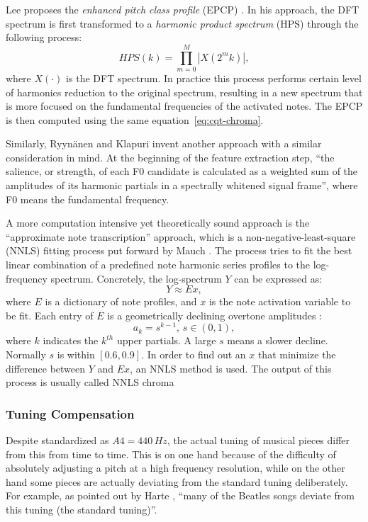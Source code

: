 Lee proposes the {\it enhanced pitch class profile} (EPCP) \cite{lee2006automatic}. In his approach, the DFT spectrum is first transformed to a {\it harmonic product spectrum} (HPS) through the following process:
\begin{equation}
HPS(k) = \prod_{m=0}^M |X(2^mk)|,
\end{equation}
where $X(\cdot)$ is the DFT spectrum. In practice this process performs certain level of harmonics reduction to the original spectrum, resulting in a new spectrum that is more focused on the fundamental frequencies of the activated notes. The EPCP is then computed using the same equation~\ref{eq:cqt-chroma}.

Similarly, Ryynänen and Klapuri invent another approach \cite{ryynanen2008automatic} with a similar consideration in mind. At the beginning of the feature extraction step, ``the salience, or strength, of each F0 candidate is calculated as a weighted sum of the amplitudes of its harmonic partials in a spectrally whitened signal frame'', where F0 means the fundamental frequency.

A more computation intensive yet theoretically sound approach is the ``approximate note transcription'' approach, which is a non-negative-least-square (NNLS) fitting process put forward by Mauch \cite{mauch2010approximate}. The process tries to fit the best linear combination of a predefined note harmonic series profiles to the log-frequency spectrum. Concretely, the log-spectrum $Y$ can be expressed as:
\begin{equation} \label{eq:2-nnls}
Y \approx Ex,
\end{equation}
where $E$ is a dictionary of note profiles, and $x$ is the note activation variable to be fit. Each entry of $E$ is a geometrically declining overtone amplitudes \cite{gomez2006tonal_b}:
\begin{equation}
a_k=s^{k-1},\,s\in(0,1),
\end{equation}
where $k$ indicates the $k^{th}$ upper partials. A large $s$ means a slower decline. Normally $s$ is within $[0.6, 0.9]$. In order to find out an $x$ that minimize the difference between $Y$ and $Ex$, an NNLS method \cite{lawson1995solving} is used. The output of this process is usually called NNLS chroma

\subsubsection{Tuning Compensation}
Despite standardized as $A4 = 440\,Hz$, the actual tuning of musical pieces differ from this from time to time. This is on one hand because of the difficulty of absolutely adjusting a pitch at a high frequency resolution, while on the other hand some pieces are actually deviating from the standard tuning deliberately. For example, as pointed out by Harte \cite{harte2010towards}, ``many of the Beatles songs deviate from this tuning (the standard tuning)''.

